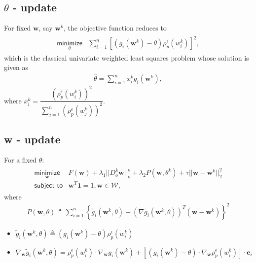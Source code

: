 \documentclass{article}
\begin{document}
\subsection{$\theta$ - update}
For fixed $\bm{w}$, say $\bm{w}^{k}$, the objective function reduces to
\begin{align}\begin{array}{ll}
\underset{\theta}{\textsf{minimize}} & \sum_{i=1}^{n}\left[\left(g_i(\bm{w}^{k}) -
                                       \theta\right)\rho^{\epsilon}_{p}\left(w^{k}_{i}\right)\right]^2,
\end{array}\end{align}
which is the classical univariate weighted least squares problem whose solution is given as
\begin{align}
\hat{\theta} = \sum_{i=1}^{n}x^{k}_{i}g_{i}\left(\bm{w}^{k}\right),
\end{align}
where $x^{k}_{i} = \dfrac{\left(\rho^{\epsilon}_p\left(w^{k}_i\right)\right)^{2}}
                  {\sum^{n}_{j = 1}\left(\rho^{\epsilon}_{p}\left(w^{k}_j\right)\right)^{2}}$.

\subsection{w - update}
For a fixed $\theta$:
\begin{align}\begin{array}{ll}
\underset{\bm{w}}{\textsf{minimize}} & F(\bm{w}) + \lambda_{1}||D^{k}_{o}\bm{w}||^{o}_{o} +
\lambda_{2}P(\bm{w}, \theta^{k}) + \tau ||\bm{w} - \bm{w}^{k}||^{2}_{2}\\
\textsf{subject to} & \bm{w}^{T}\bm{1} = 1, \bm{w} \in \mathcal{W},
\end{array}\end{align}
where
\begin{align}
P(\bm{w}, \theta) \triangleq \sum^{n}_{i=1}\left\{\tilde{g}_{i}(\bm{w}^{k}, \theta) +
                  (\nabla\tilde{g}_{i}(\bm{w}^{k}, \theta))^{T}(\bm{w} - \bm{w}^{k})\right\}^{2}
\end{align}
\begin{itemize}
\item $\tilde{g}_{i}(\bm{w}^{k}, \theta) \triangleq (g_i(\bm{w}^{k}) - \theta) \rho^{\epsilon}_{p}(w^{k}_{i})$
\item $\nabla_{\bm{w}}\tilde{g}_{i}(\bm{w}^{k}, \theta) = \rho^{\epsilon}_{p}(w^{k}_i)\cdot\nabla_{\bm{w}} g_{i}(\bm{w}^{k}) +
       \left[(g_{i}(\bm{w}^k) - \theta)\cdot\nabla_{\bm{w}}\rho^{\epsilon}_{p}(w^k_i)\right]\cdot \bm{e}_i$
\end{itemize}
\end{document}

